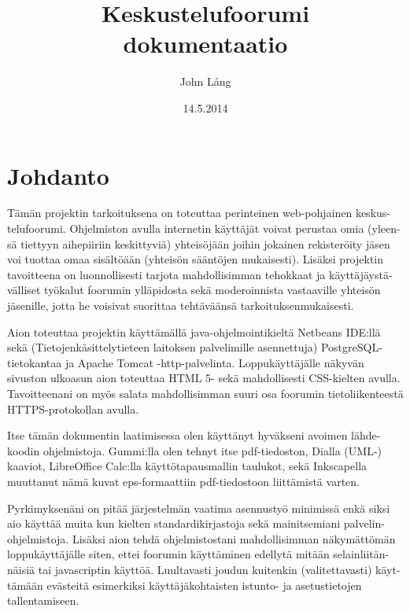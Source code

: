 \documentclass[11pt]{article}
\title{\textbf{Keskustelufoorumi}\\ \small{dokumentaatio}}
\author{John Lång}
\date{14.5.2014}
\begin{document}
\maketitle

\thispagestyle{empty}

\newpage
\tableofcontents
\thispagestyle{empty}

\newpage

\section{Johdanto}
	Tämän projektin tarkoituksena on toteuttaa perinteinen web-pohjainen keskus-telufoorumi. Ohjelmiston
	avulla internetin käyttäjät voivat perustaa omia (yleen-sä tiettyyn aihepiiriin keskittyviä) yhteisöjään
	joihin jokainen rekisteröity jäsen voi tuottaa omaa sisältöään (yhteisön sääntöjen mukaisesti). Lisäksi
	projektin tavoitteena on luonnollisesti tarjota mahdollisimman tehokkaat ja käyttäjäystä-välliset työkalut 
	foorumin ylläpidosta sekä moderoinnista vastaaville yhteisön jäsenille, jotta he voisivat suorittaa
	tehtäväänsä	tarkoituksenmukaisesti.
		
	Aion toteuttaa projektin käyttämällä java-ohjelmointikieltä Netbeans IDE:llä sekä (Tietojenkäsittelytieteen laitoksen
	palvelimille asennettuja) PostgreSQL-tietokantaa ja Apache Tomcat -http-palvelinta. Loppukäyttäjälle
	näkyvän sivuston ulkoasun aion toteuttaa HTML 5- sekä mahdollisesti CSS-kielten avulla. Tavoitteenani
	on myös salata mahdollisimman suuri osa foorumin tietoliikenteestä HTTPS-protokollan avulla.
	
	Itse tämän dokumentin laatimisessa olen käyttänyt hyväkseni avoimen lähde-koodin ohjelmistoja.
	Gummi:lla olen tehnyt itse pdf-tiedoston, Dialla (UML-)\\ kaaviot, LibreOffice Calc:lla käyttötapausmallin
	taulukot, sekä Inkscapella muuttanut nämä kuvat eps-formaattiin pdf-tiedostoon liittämistä varten.
	
	Pyrkimyksenäni on pitää järjestelmän vaatima asennustyö minimissä enkä siksi aio käyttää muita kun kielten
	standardikirjastoja sekä mainitsemiani palvelin-ohjelmistoja. Lisäksi aion tehdä ohjelmistostani mahdollisimman näkymättömän loppukäyttäjälle
	siten, ettei foorumin käyttäminen edellytä mitään selainliitän-näisiä tai javascriptin käyttöä. Luultavasti
	joudun kuitenkin (valitettavasti) käyt-tämään evästeitä esimerkiksi käyttäjäkohtaisten istunto- ja
	asetustietojen tallentamiseen.
	
\end{document}
